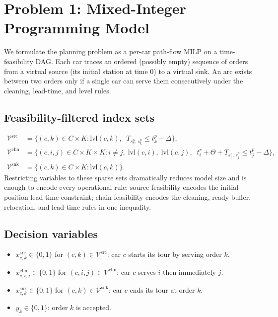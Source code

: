 \documentclass[a4paper, 12pt]{article}
\begin{document}
\section{Problem 1: Mixed-Integer Programming Model}\label{sec:milp}

We formulate the planning problem as a per-car path-flow MILP on a time-feasibility DAG. Each car traces an ordered (possibly empty) sequence of orders from a virtual source (its initial station at time 0) to a virtual sink. An arc exists between two orders only if a single car can serve them consecutively under the cleaning, lead-time, and level rules.

\subsection{Feasibility-filtered index sets}

\begin{align*}
\mathcal{V}^{\text{src}} &= \bigl\{ (c,k)\in C\times K : \mathrm{lvl}(c,k),\;\; T_{s^0_c,\,s^p_k}\le t^p_k - \Delta\bigr\}, \\
\mathcal{V}^{\text{chn}} &= \bigl\{ (c,i,j)\in C\times K\times K : i\ne j,\; \mathrm{lvl}(c,i),\; \mathrm{lvl}(c,j),\;\; t^r_i + \Theta + T_{s^r_i,\,s^p_j} \le t^p_j - \Delta\bigr\}, \\
\mathcal{V}^{\text{snk}} &= \bigl\{ (c,k)\in C\times K : \mathrm{lvl}(c,k)\bigr\}.
\end{align*}
Restricting variables to these sparse sets dramatically reduces model size and is enough to encode every operational rule: source feasibility encodes the initial-position lead-time constraint; chain feasibility encodes the cleaning, ready-buffer, relocation, and lead-time rules in one inequality.

\subsection{Decision variables}

\begin{itemize}
\item $x^{\text{src}}_{c,k}\in\{0,1\}$ for $(c,k)\in\mathcal{V}^{\text{src}}$: car $c$ starts its tour by serving order $k$.
\item $x^{\text{chn}}_{c,i,j}\in\{0,1\}$ for $(c,i,j)\in\mathcal{V}^{\text{chn}}$: car $c$ serves $i$ then immediately $j$.
\item $x^{\text{snk}}_{c,k}\in\{0,1\}$ for $(c,k)\in\mathcal{V}^{\text{snk}}$: car $c$ ends its tour at order $k$.
\item $y_k\in\{0,1\}$: order $k$ is accepted.
\end{itemize}
\end{document}
